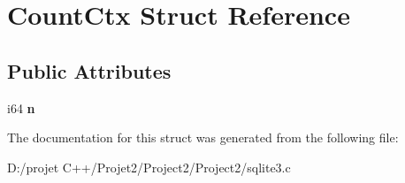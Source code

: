 \hypertarget{struct_count_ctx}{}\section{Count\+Ctx Struct Reference}
\label{struct_count_ctx}
\subsection*{Public Attributes}
\begin{DoxyCompactItemize}
\item 
\mbox{\label{struct_count_ctx_a141c718918dbfaa183f772bfd7a516f4}} 
i64 {\bfseries n}
\end{DoxyCompactItemize}


The documentation for this struct was generated from the following file\+:\begin{DoxyCompactItemize}
\item 
D\+:/projet C++/\+Projet2/\+Project2/\+Project2/sqlite3.\+c\end{DoxyCompactItemize}
